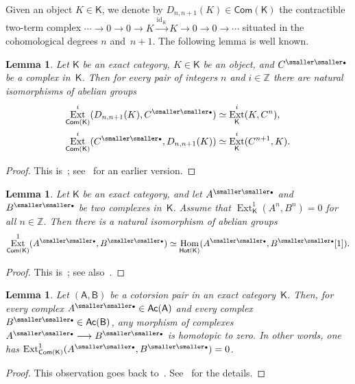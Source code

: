 \documentclass[12pt,a4paper]{amsart}
\newcommand{\+}{\nobreakdash-}
\renewcommand{\:}{\colon}
\newcommand{\rarrow}{\longrightarrow}
\newcommand{\bu}{{\text{\smaller\smaller$\scriptstyle\bullet$}}}
\DeclareMathOperator{\Hom}{Hom}
\DeclareMathOperator{\Ext}{Ext}
\newcommand{\sA}{\mathsf A}
\newcommand{\sB}{\mathsf B}
\newcommand{\sK}{\mathsf K}
\newcommand{\Hot}{\mathsf{Hot}}
\newcommand{\Com}{\mathsf{Com}}
\newcommand{\Ac}{\mathsf{Ac}}
\newcommand{\id}{\mathrm{id}}
\newcommand{\boZ}{\mathbb Z}
\theoremstyle{plain}
\newtheorem{lem}[thm]{Lemma}
\theoremstyle{definition}
\begin{document}
 Given an object $K\in\sK$, we denote by $D_{n,n+1}(K)\in\Com(\sK)$
the contractible two-term complex $\dotsb\rarrow0\rarrow 0\rarrow K
\overset{\id_K}\rarrow K\rarrow0\rarrow0\rarrow\dotsb$ situated
in the cohomological degrees $n$ and~$n+1$.
 The following lemma is well known.

\begin{lem} \label{disk-complexes-Ext-lemma}
 Let\/ $\sK$ be an exact category, $K\in\sK$ be an object, and
$C^\bu$ be a complex in\/~$\sK$.
 Then for every pair of integers $n$ and $i\in\boZ$ there are
natural isomorphisms of abelian groups
\begin{align*}
 \Ext^i_{\Com(\sK)}(D_{n,n+1}(K),C^\bu) &\simeq \Ext^i_\sK(K,C^n), \\
 \Ext^i_{\Com(\sK)}(C^\bu,D_{n,n+1}(K)) &\simeq \Ext^i_\sK(C^{n+1},K).
\end{align*}
\end{lem}

\begin{proof}
 This is~\cite[Lemma~1.8]{Pal}; see~\cite[Lemma~3.1]{Gil} for
an earlier version.
\end{proof}

\begin{lem} \label{Ext1-as-homotopy-Hom-lemma}
 Let\/ $\sK$ be an exact category, and let $A^\bu$ and $B^\bu$ be two
complexes in\/~$\sK$.
 Assume that\/ $\Ext^1_\sK(A^n,B^n)=0$ for all $n\in\boZ$.
 Then there is a natural isomorphism of abelian groups
$$
 \Ext^1_{\Com(\sK)}(A^\bu,B^\bu)\simeq\Hom_{\Hot(\sK)}(A^\bu,B^\bu[1]).
$$
\end{lem}

\begin{proof}
 This is~\cite[Lemma~2.1]{Gil}; see also~\cite[Lemma~1.6]{BHP}.
\end{proof}

\begin{lem} \label{acycl-acycl-orthogonality-lemma}
 Let $(\sA,\sB)$ be a cotorsion pair in an exact category\/~$\sK$.
 Then, for every complex $A^\bu\in\Ac(\sA)$ and every complex $B^\bu\in
\Ac(\sB)$, any morphism of complexes $A^\bu\rarrow B^\bu$ is homotopic
to zero.
 In other words, one has\/ $\Ext^1_{\Com(\sK)}(A^\bu,B^\bu)=0$.
\end{lem}

\begin{proof}
 This observation goes back to~\cite[Lemma~3.9]{Gil}.
 See~\cite[Lemma~B.1.8]{Pcosh} for the details.
\end{proof}
\end{document}
